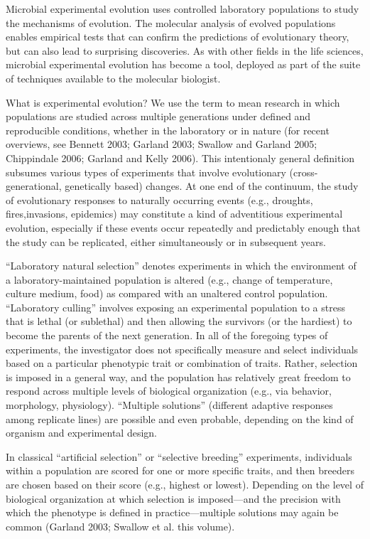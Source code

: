 \cite{mcdonald2019microbial}

Microbial experimental evolution uses controlled laboratory populations to study the mechanisms of evolution. The molecular analysis of evolved populations enables empirical tests that can confirm the predictions of evolutionary theory, but can also lead to surprising discoveries. As with other fields in the life sciences, microbial experimental evolution has become a tool, deployed as part of the suite of techniques available to the molecular biologist.



\cite{garland2009experimental}
What is experimental evolution? We use the term to mean research in which populations are studied across multiple generations under defined and reproducible conditions, whether in the laboratory or in nature (for recent overviews, see Bennett 2003; Garland 2003; Swallow and Garland 2005; Chippindale 2006; Garland and Kelly 2006). This intentionaly general definition subsumes various types of experiments that involve evolutionary (cross-generational, genetically based) changes. At one end of the continuum, the study of evolutionary responses to naturally occurring events (e.g., droughts, fires,invasions, epidemics) may constitute a kind of adventitious experimental evolution, especially if these events occur repeatedly and predictably enough that the study can be replicated, either simultaneously or in subsequent years.

“Laboratory natural selection” denotes experiments in which the environment of a laboratory-maintained population is altered (e.g., change of temperature, culture medium, food) as compared with an unaltered control population. “Laboratory culling” involves exposing an experimental population to a stress that is lethal (or sublethal) and then allowing the survivors (or the hardiest) to become the parents of the next generation. In all of the foregoing types of experiments, the investigator does not specifically measure and select individuals based on a particular phenotypic trait or combination of traits. Rather, selection is imposed in a general way, and the population has relatively great freedom to respond across multiple levels of biological organization (e.g., via behavior, morphology, physiology). “Multiple solutions” (different adaptive responses among replicate lines) are possible and even probable, depending on the kind of organism and experimental design.

In classical “artificial selection” or “selective breeding” experiments, individuals within a population are scored for one or more specific traits, and then breeders are chosen based on their score (e.g., highest or lowest). Depending on the level of biological organization at which selection is imposed—and the precision with which the phenotype is defined in practice—multiple solutions may again be common (Garland 2003; Swallow et al. this volume).

